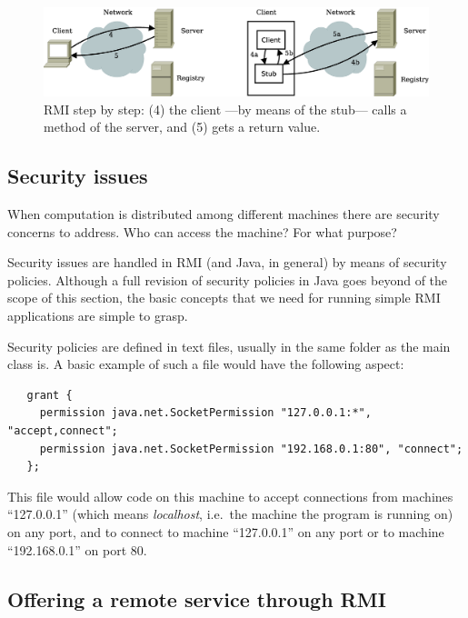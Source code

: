 \begin{figure}[hbtp]
  \centering
  \includegraphics[width=\textwidth]{gfx/rmi-steps3}
  \caption{RMI step by step: (4) the client ---by means of the stub---
  calls a method of the server, and (5) gets a return value. }
  \label{fig:rmiflow3}
\end{figure}

\subsection{Security issues}
\label{sec:security}

When computation is distributed among different machines there are
security concerns to address. Who can access the machine? For what
purpose? 

Security issues are handled in RMI (and Java, in general) by means of security
policies. Although a full revision of security policies in Java goes
beyond of the scope of this section, the basic concepts that we need
for running simple RMI applications are simple to grasp. 

Security policies are defined in text files, usually in the same
folder as the main class is. A basic example of such a file would
have the following aspect: 

\begin{verbatim}
   grant {
     permission java.net.SocketPermission "127.0.0.1:*", "accept,connect";
     permission java.net.SocketPermission "192.168.0.1:80", "connect";
   };
\end{verbatim}

This file would allow code on this machine to accept connections from
machines ``127.0.0.1'' (which
means \emph{localhost}, i.e.~the machine the program is running on) on
any port, and to connect to machine ``127.0.0.1'' on any port or to
machine ``192.168.0.1'' on port 80. 


\subsection{Offering a remote service through RMI}
\label{sec:offer-remote-serv}

